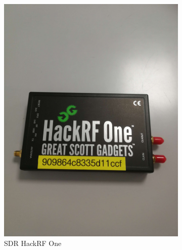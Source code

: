 \begin{figure}[h]
\centering
\begin{subfigure}{0.4\textwidth}
  \centering
  \includegraphics[width=\textwidth]{images/hackrf.png}
  \caption{SDR HackRF One}
  \label{term330}
\end{subfigure}
\hspace{0.5cm} %
\begin{subfigure}{0.4\textwidth}
  \centering

\end{subfigure}
\end{figure}
